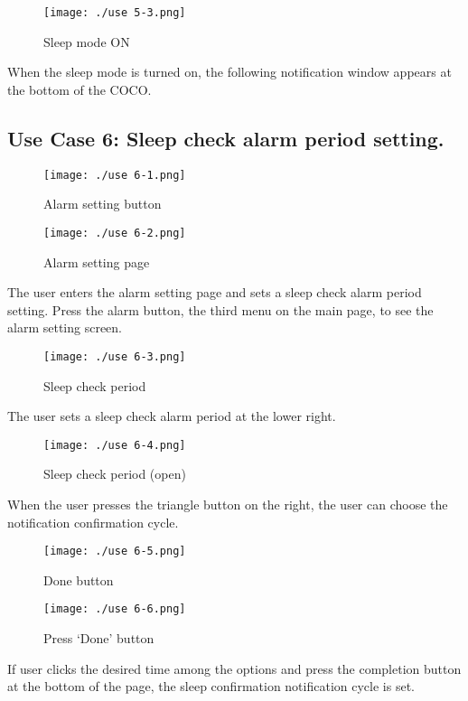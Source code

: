 \documentclass[conference]{IEEEtran}
\begin{document}
\begin{figure}[H]
\texttt{[image: ./use 5-3.png]}
\centering
\caption{Sleep mode ON}
\end{figure}

When the sleep mode is turned on, the following notification window appears at the bottom of the COCO.

\subsection{Use Case 6: Sleep check alarm period setting.}

\begin{figure}[H]
\texttt{[image: ./use 6-1.png]}
\centering
\caption{Alarm setting button}
\end{figure}

\begin{figure}[H]
\texttt{[image: ./use 6-2.png]}
\centering
\caption{Alarm setting page}
\end{figure}

The user enters the alarm setting page and sets a sleep check alarm period setting. Press the alarm button, the third menu on the main page, to see the alarm setting screen.

\begin{figure}[H]
\texttt{[image: ./use 6-3.png]}
\centering
\caption{Sleep check period}
\end{figure}

The user sets a sleep check alarm period at the lower right.

\begin{figure}[H]
\texttt{[image: ./use 6-4.png]}
\centering
\caption{Sleep check period (open)}
\end{figure}

When the user presses the triangle button on the right, the user can choose the notification confirmation cycle.

\begin{figure}[H]
\texttt{[image: ./use 6-5.png]}
\centering
\caption{Done button}
\end{figure}

\begin{figure}[H]
\texttt{[image: ./use 6-6.png]}
\centering
\caption{Press ‘Done' button}
\end{figure}

If user clicks the desired time among the options and press the completion button at the bottom of the page, the sleep confirmation notification cycle is set.
\end{document}
